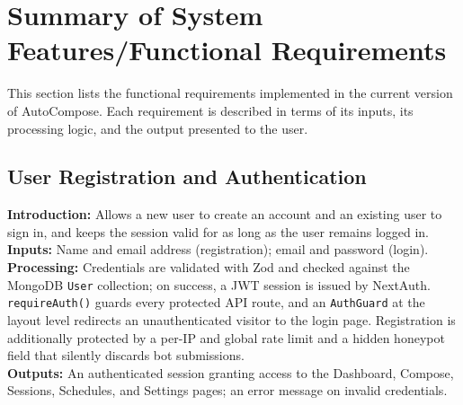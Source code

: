 \documentclass[12pt,a4paper]{article}
\begin{document}
\section{Summary of System Features/Functional Requirements}

This section lists the functional requirements implemented in the current version of AutoCompose. Each requirement is described in terms of its inputs, its processing logic, and the output presented to the user.

\subsection{User Registration and Authentication}
\noindent\textbf{Introduction:} Allows a new user to create an account and an existing user to sign in, and keeps the session valid for as long as the user remains logged in.\\
\noindent\textbf{Inputs:} Name and email address (registration); email and password (login).\\
\noindent\textbf{Processing:} Credentials are validated with Zod and checked against the MongoDB \texttt{User} collection; on success, a JWT session is issued by NextAuth. \texttt{requireAuth()} guards every protected API route, and an \texttt{AuthGuard} at the layout level redirects an unauthenticated visitor to the login page. Registration is additionally protected by a per-IP and global rate limit and a hidden honeypot field that silently discards bot submissions.\\
\noindent\textbf{Outputs:} An authenticated session granting access to the Dashboard, Compose, Sessions, Schedules, and Settings pages; an error message on invalid credentials.
\end{document}

